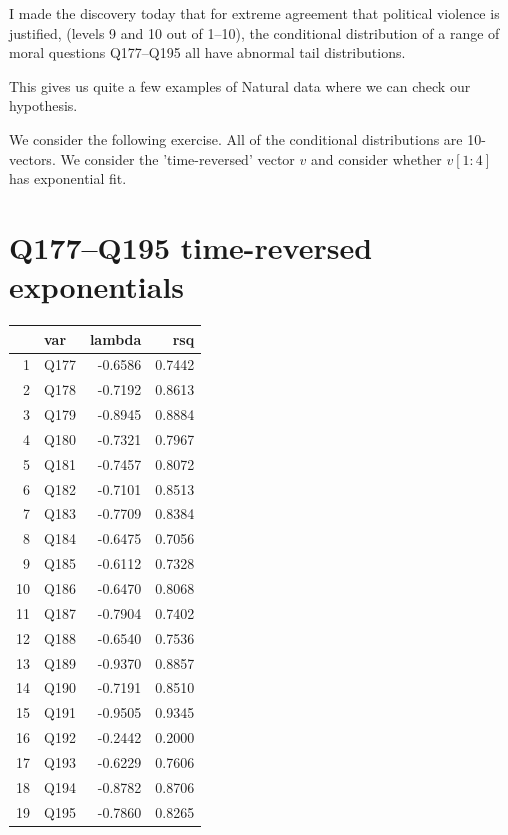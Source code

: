 \documentclass{amsart}
\begin{document}
I made the discovery today that for extreme agreement that political violence is justified, (levels 9 and 10 out of 1--10), the conditional distribution of a range of moral questions Q177--Q195 all have abnormal tail distributions.  

This gives us quite a few examples of Natural data where we can check our hypothesis.

We consider the following exercise.  All of the conditional distributions are 10-vectors.  We consider the 'time-reversed' vector $v$ and consider whether $v[1:4]$ has exponential fit.  

\section{Q177--Q195 time-reversed exponentials}

\begin{table}[ht]
\centering
\begin{tabular}{rlrr}
  \hline
 & var & lambda & rsq \\ 
  \hline
1 & Q177 & -0.6586 & 0.7442 \\ 
  2 & Q178 & -0.7192 & 0.8613 \\ 
  3 & Q179 & -0.8945 & 0.8884 \\ 
  4 & Q180 & -0.7321 & 0.7967 \\ 
  5 & Q181 & -0.7457 & 0.8072 \\ 
  6 & Q182 & -0.7101 & 0.8513 \\ 
  7 & Q183 & -0.7709 & 0.8384 \\ 
  8 & Q184 & -0.6475 & 0.7056 \\ 
  9 & Q185 & -0.6112 & 0.7328 \\ 
  10 & Q186 & -0.6470 & 0.8068 \\ 
  11 & Q187 & -0.7904 & 0.7402 \\ 
  12 & Q188 & -0.6540 & 0.7536 \\ 
  13 & Q189 & -0.9370 & 0.8857 \\ 
  14 & Q190 & -0.7191 & 0.8510 \\ 
  15 & Q191 & -0.9505 & 0.9345 \\ 
  16 & Q192 & -0.2442 & 0.2000 \\ 
  17 & Q193 & -0.6229 & 0.7606 \\ 
  18 & Q194 & -0.8782 & 0.8706 \\ 
  19 & Q195 & -0.7860 & 0.8265 \\ 
   \hline
\end{tabular}
\end{table}
\end{document}
